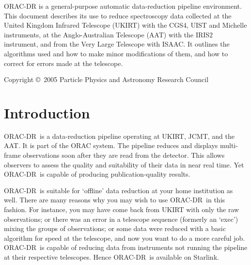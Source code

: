 \documentclass[twoside,11pt]{article}
\newcommand{\stardocinitials}  {SUN}
\newcommand{\stardoccopyright} {Copyright \copyright\ 2005 Particle Physics and Astronomy Research Council}
\newcommand{\stardocnumber}    {236.5}
\newcommand{\stardocabstract}  {{\footnotesize ORAC-DR} is a
general-purpose automatic data-reduction pipeline environment.  This
document describes its use to reduce spectroscopy data collected at the
United Kingdom Infrared Telescope (UKIRT) with the CGS4, UIST and Michelle
instruments, at the Anglo-Australian Telescope (AAT) with the IRIS2
instrument, and from the Very Large Telescope with ISAAC. It outlines the
algorithms used and how to make minor modifications of them, and how
to correct for errors made at the telescope.}
\newcommand{\stardocname}{\stardocinitials /\stardocnumber}
\newcommand{\htmladdnormallink}[2]{#1}
\newenvironment{latexonly}{}{}
\newcommand{\xlabel}[1]{}
\renewcommand{\_}{\texttt{\symbol{95}}}
\newcommand{\ORACDR}{{\footnotesize ORAC-DR}}
\newcommand{\AAT}{\htmladdnormallink{AAT}{http://www.aao.gov.au/}}
\newcommand{\JCMT}{\htmladdnormallink{JCMT}{http://www.jach.hawaii.edu/JACpublic/JCMT/}}
\newcommand{\UKIRT}{\htmladdnormallink{UKIRT}{http://www.jach.hawaii.edu/JACpublic/UKIRT/}}
\renewcommand{\thepage}{\roman{page}}
\begin{document}
\stardocabstract

\begin{latexonly}
\newpage
\vspace*{\fill}
\stardoccopyright
\end{latexonly}

  \newpage
  \begin{latexonly}
    \setlength{\parskip}{0mm}
    \tableofcontents
    \setlength{\parskip}{\medskipamount}
    \markboth{\stardocname}{\stardocname}
  \end{latexonly}

\cleardoublepage
\renewcommand{\thepage}{\arabic{page}}
\setcounter{page}{1}


\section{\xlabel{introduction}Introduction\label{introduction}}

\ORACDR\ is a data-reduction pipeline operating at \UKIRT, \JCMT, and
the \AAT. It is part of the \htmladdnormallink{ORAC system}{http://www.stsci.edu/stsci/meetings/adassVII/bridgera.html}.
The pipeline reduces and displays multi-frame observations soon after
they are read from the detector. This allows observers to assess the
quality and suitability of their data in near real time. Yet \ORACDR\
is capable of producing publication-quality results.

\ORACDR\ is suitable for `offline' data reduction at your home
institution as well. There are many reasons why you may wish to use
\ORACDR\ in this fashion. For instance, you may have come back from
UKIRT with only the raw observations; or there was an error in a
telescope sequence (formerly an `exec') mixing the groups of
observations; or some data were reduced with a basic algorithm for
speed at the telescope, and now you want to do a more careful job.
\ORACDR\ is capable of reducing data from instruments not running
the pipeline at their respective telescopes. Hence \ORACDR\ is 
available on Starlink.
\end{document}
